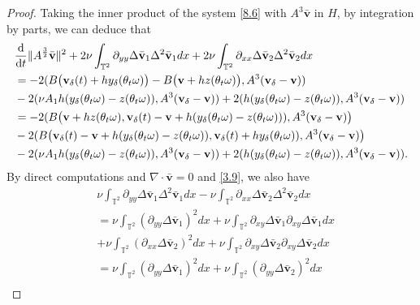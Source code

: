 \documentclass{elsarticle}
\theoremstyle{definition}
\numberwithin{equation}{section}
\renewcommand{\d}{{\rm{d}}}
\begin{document}
\begin{proof} Taking the inner product of the system   \eqref{8.6} with $A^3\bar{\textbf{v}}$ in $H$,  by integration by parts, we can deduce that
\begin{align}\label{9.10}
&\frac{\d}{\d t}\|A^{\frac32}\bar{\textbf{v}}\|^2+2\nu \int_{\mathbb{T}^2}\partial_{yy}\Delta \bar{\textbf{v}}_1\Delta^2\bar{\textbf{v}}_1dx+2\nu \int_{\mathbb{T}^2}\partial_{xx}\Delta \bar{\textbf{v}}_2\Delta^2 \bar{\textbf{v}}_2dx\nonumber\\
&=-2(B\big( \textbf{v}_\delta(t)+hy_\delta(\theta_t\omega)\big)-B\big( \textbf{v}+hz(\theta_t\omega)\big),A^3(\textbf{v}_\delta-\textbf{v}))\nonumber\\
&-  2(\nu A_1h(y_\delta(\theta_t\omega)-z(\theta_t\omega)),A^3(\textbf{v}_\delta-\textbf{v}))
+2(h(y_\delta (\theta_t\omega)-z(\theta_t\omega)),A^3(\textbf{v}_\delta-\textbf{v}))\nonumber\\
&=-2(B\big(\textbf{v}+hz(\theta_t\omega),\textbf{v}_\delta(t)-\textbf{v}+h(y_\delta(\theta_t\omega)-z(\theta_t\omega)))
,A^3(\textbf{v}_\delta-\textbf{v})\big)\nonumber\\
&-2(B\big( \textbf{v}_\delta(t)-\textbf{v}+h(y_\delta(\theta_t\omega)-z(\theta_t\omega)),\textbf{v}_\delta(t)+hy_\delta(\theta_t\omega))
,A^3(\textbf{v}_\delta-\textbf{v})\big)\nonumber\\
&-  2(\nu A_1h(y_\delta(\theta_t\omega)-z(\theta_t\omega)),A^3(\textbf{v}_\delta-\textbf{v}))
+2(h(y_\delta (\theta_t\omega)-z(\theta_t\omega)),A^3(\textbf{v}_\delta-\textbf{v})).
\end{align}
By direct computations and $\nabla\cdot \bar{\textbf{v}}=0$ and \eqref{3.9}, we also have
\begin{align}\label{9.11}
&\nu \int_{\mathbb{T}^2}\partial_{yy}\Delta \bar{\textbf{v}}_1\Delta^2 \bar{\textbf{v}}_1dx-\nu \int_{\mathbb{T}^2}\partial_{xx}\Delta \bar{\textbf{v}}_2\Delta^2 \bar{\textbf{v}}_2dx\nonumber\\
&= \nu \int_{\mathbb{T}^2}(\partial_{yy}\Delta \bar{\textbf{v}}_1)^2dx+\nu \int_{\mathbb{T}^2}\partial_{xy}\Delta \bar{\textbf{v}}_1\partial_{xy}\Delta \bar{\textbf{v}}_1dx\nonumber\\
&+\nu \int_{\mathbb{T}^2}(\partial_{xx}\Delta \bar{\textbf{v}}_2)^2dx+\nu \int_{\mathbb{T}^2}\partial_{xy}\Delta \bar{\textbf{v}}_2\partial_{xy}\Delta \bar{\textbf{v}}_2dx
\nonumber\\
&=\nu \int_{\mathbb{T}^2}(\partial_{yy}\Delta \bar{\textbf{v}}_1)^2dx+\nu \int_{\mathbb{T}^2}(\partial_{yy}\Delta \bar{\textbf{v}}_2)^2dx\nonumber\\

\end{align}
\end{proof}
\end{document}
